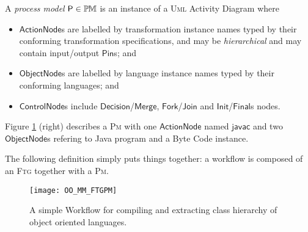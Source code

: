 
\begin{Definition}
A \emph{process model} $\mathsf{P}\in\mathbb{P}\mskip-1mu\mathbb{M}$ is an instance of a \textsc{Uml}
Activity Diagram where
\begin{itemize}
   \item $\mathsf{ActionNode}$s are labelled by transformation instance names 
typed by their conforming transformation specifications, and may be 
\emph{hierarchical} and may contain input/output $\mathsf{Pin}$s; and 
   \item $\mathsf{ObjectNode}$s are labelled by language instance names typed 
by their conforming languages; and 
   \item $\mathsf{ControlNode}$s include 
$\mathsf{Decision}$/$\mathsf{Merge}$, $\mathsf{Fork}$/$\mathsf{Join}$ and 
$\mathsf{Init}$/$\mathsf{Final}$s nodes.   
\end{itemize}
\end{Definition}
Figure \ref{fig:OO_FTGPM} (right) describes a \textsc{Pm} with one 
$\mathsf{ActionNode}$ named $\mathsf{javac}$ and two $\mathsf{ObjectNode}$s 
refering to Java program and a Byte Code instance.

\medskip
The following definition simply puts things together: a workflow is composed of 
an \textsc{Ftg} together with a \textsc{Pm}. 

\begin{figure}[t]
     \centering
   \texttt{[image: OO\_MM\_FTGPM]}
   \caption{A simple Workflow for compiling and extracting class hierarchy of 
object oriented languages.}
   \label{fig:OO_FTGPM}%
\end{figure}



